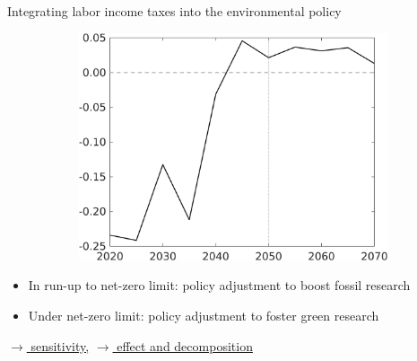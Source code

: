 \documentclass[11pt,aspectratio=169]{beamer}
\begin{document}
\begin{frame}{Integrating labor income taxes into the environmental policy}
\begin{figure}[h!!]
\begin{subfigure}{0.45\textwidth}
			\includegraphics[width=1\textwidth]{../codding_model/own_basedOnFried/optimalPol_010922_revision/figures/all_13Sept22/NewCalib_polTaulFixedPer_T_Tauf_Sun2_emnet1_spillover0_knspil3_xgr0_nsk0_sep0_extern0_PV1_etaa0.79.png}
		\end{subfigure}
	\end{figure}
	\vspace{3mm}	
	\begin{block}{}
		\begin{itemize}
			\item In run-up to net-zero limit: policy adjustment to boost fossil research
			\item Under net-zero limit: policy adjustment to foster green research
		\end{itemize}
	\end{block}	
	\vspace{-5.7mm}
	\hfill
	\hyperlink{sensphi}{\tiny{$\rightarrow$ sensitivity,}} 
	\hyperlink{eff}{\tiny{$\rightarrow$ effect and decomposition}}
	\hypertarget{backmec}{}
\end{frame}

		
	\hypertarget{conc}{}
\end{document}

